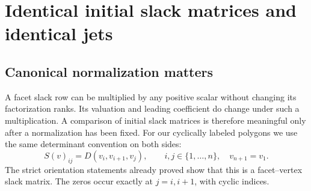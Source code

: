 \documentclass[11pt,a4paper]{article}
\numberwithin{equation}{section}
\theoremstyle{plain}
\begin{document}
\section{Identical initial slack matrices and identical jets}\label{poly:ic:sec:slack}

\subsection{Canonical normalization matters}
A facet slack row can be multiplied by any positive scalar without changing
its factorization ranks. Its valuation and leading coefficient do change
under such a multiplication. A comparison of initial slack matrices is
therefore meaningful only after a normalization has been fixed. For our
cyclically labeled polygons we use the same determinant convention on
both sides:
\begin{equation}\label{poly:ic:eq:canonicalslack}
 S(v)_{ij}=D(v_i,v_{i+1},v_j),\qquad i,j\in\{1,\ldots,n\},
 \quad v_{n+1}=v_1.
\end{equation}
The strict orientation statements already proved show that this is a
facet--vertex slack matrix. The zeros occur exactly at $j=i,i+1$, with
cyclic indices.
\end{document}
